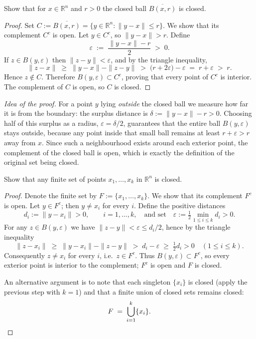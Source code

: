 \documentclass[10pt]{extarticle}
\begin{document}
\begin{exercise}[4.4]
    Show that for $x \in \mathbb{R}^n$ and $r>0$ the closed ball $\overline{B(x , r)}$ is closed.
\end{exercise}

\begin{proof}
    Set $C:=\overline{B(x,r)}=\{y\in\mathbb R^{n}:\|y-x\|\le r\}$.  We show that its complement $C^{c}$ is open.  Let $y\in C^{c}$, so $\|y-x\|>r$.  Define
    \[
        \varepsilon\;:=\;\frac{\|y-x\|-r}{2}\;>\;0.
    \]
    If $z\in B(y,\varepsilon)$ then $\|z-y\|<\varepsilon$, and by the triangle inequality,
    \[
        \|z-x\|\;\ge\;\|y-x\|-\|z-y\|\;>\;\bigl(r+2\varepsilon\bigr)-\varepsilon\;=\;r+\varepsilon\;>\;r.
    \]
    Hence $z\notin C$.  Therefore $B(y,\varepsilon)\subset C^{c}$, proving that every point of $C^{c}$ is interior.  The complement of $C$ is open, so $C$ is closed.
\end{proof}

\begin{remark}
    \emph{Idea of the proof.}  For a point $y$ lying \emph{outside} the closed ball we measure how far it is from the boundary: the surplus distance is $\delta:=\|y-x\|-r>0$.  Choosing half of this surplus as a radius, $\varepsilon=\delta/2$, guarantees that the entire ball $B(y,\varepsilon)$ stays outside, because any point inside that small ball remains at least $r+\varepsilon>r$ away from $x$.  Since such a neighbourhood exists around each exterior point, the complement of the closed ball is open, which is exactly the definition of the original set being closed.
\end{remark}

\begin{exercise}[4.5]
    Show that any finite set of points $x _1, \ldots, x _k$ in $\mathbb{R}^n$ is closed.
\end{exercise}

\begin{proof}
    Denote the finite set by $F:=\{x_{1},\ldots,x_{k}\}$.  We show that its complement $F^{c}$ is open.  Let $y\in F^{c}$; then $y\neq x_{i}$ for every $i$.  Define the positive distances
    \[
        d_{i}:=\|y-x_{i}\|>0, \qquad i=1,\ldots,k, \quad\text{and set}\quad \varepsilon:=\tfrac12\min_{1\le i\le k} d_{i}>0.
    \]
    For any $z\in B(y,\varepsilon)$ we have $\|z-y\|<\varepsilon\le d_{i}/2$, hence by the triangle inequality
    \[
        \|z-x_{i}\| \;\ge\; \|y-x_{i}\|-\|z-y\| \;>\; d_{i}-\varepsilon \;\ge\; \tfrac12 d_{i}>0\quad(1\le i\le k).
    \]
    Consequently $z\neq x_{i}$ for every $i$, i.e.~$z\in F^{c}$.  Thus $B(y,\varepsilon)\subset F^{c}$, so every exterior point is interior to the complement; $F^{c}$ is open and $F$ is closed.

    An alternative argument is to note that each singleton $\{x_{i}\}$ is closed (apply the previous step with $k=1$) and that a finite union of closed sets remains closed:
    \[
        F\;=\;\bigcup_{i=1}^{k}\{x_{i}\}.\qedhere
    \]
\end{proof}
\end{document}
